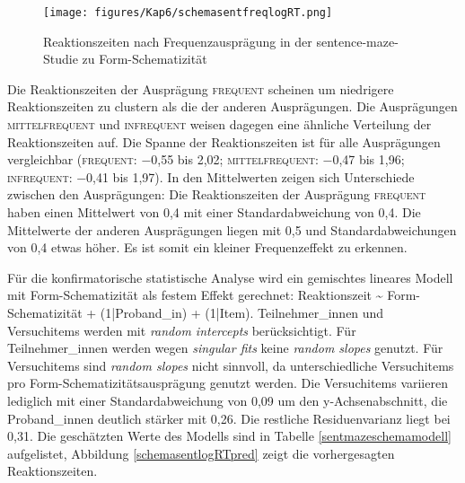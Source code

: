 \begin{figure}
\texttt{[image: figures/Kap6/schemasentfreqlogRT.png]} 
\caption{Reaktionszeiten nach Frequenzausprä\-gung in der sen\-ten\-ce-maze-Stu\-die zu Form-Sche\-ma\-ti\-zi\-tät}
\label{rtschemasentfreq}
\end{figure}

Die Reaktionszeiten der Ausprägung \textsc{frequent} scheinen um niedrigere Reaktionszeiten zu clustern als die der anderen Ausprägungen. Die Ausprägungen \textsc{mittelfrequent} und \textsc{infrequent} weisen dagegen eine ähnliche Verteilung der Reaktionszeiten auf. Die Spanne der Reaktionszeiten ist für alle Ausprägungen vergleichbar (\textsc{frequent}: −0,55 bis 2,02; \textsc{mittelfrequent}: −0,47 bis 1,96; \textsc{infrequent}: −0,41 bis 1,97). In den Mittelwerten zeigen sich Unterschiede zwischen den Ausprägungen: Die Reaktionszeiten der Ausprägung \textsc{frequent} haben einen Mittelwert von 0,4 mit einer Standardabweichung von 0,4. Die Mittelwerte der anderen Ausprägungen liegen mit 0,5 und Standardabweichungen von 0,4 etwas höher. Es ist somit ein kleiner Frequenzeffekt zu erkennen.\largerpage

Für die konfirmatorische statistische Analyse wird ein gemischtes lineares Modell mit Form-Schema\-ti\-zi\-tät als festem Effekt gerechnet: Reaktionszeit \~{} Form-Schematizität + (1|Proband\_in) + (1|Item). Teilnehmer\_innen und Versuchitems werden mit \textit{random intercepts} berücksichtigt. Für Teilnehmer\_innen werden wegen \textit{singular fits} keine \textit{random slopes} genutzt. Für Versuchitems sind \textit{random slopes} nicht sinnvoll, da unterschiedliche Versuchitems pro Form-Sche\-ma\-ti\-zi\-täts\-aus\-prä\-gung genutzt werden.  Die Versuchitems variieren lediglich mit einer Standardabweichung von 0,09 um den y-Achsenabschnitt, die Proband\_innen  deutlich stärker mit 0,26. Die restliche Residuenvarianz liegt bei 0,31. Die geschätzten Werte des Modells sind in Tabelle \ref{sentmazeschemamodell} aufgelistet, Abbildung \ref{schemasentlogRTpred} zeigt die vorhergesagten Re\-ak\-tions\-zei\-ten. 

